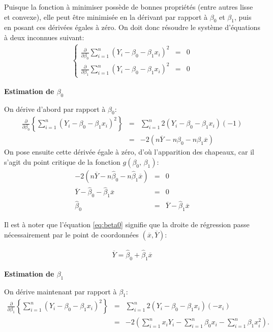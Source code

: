 Puisque la fonction \`a minimiser possède de bonnes propri\'et\'es
(entre autres lisse et convexe), elle peut être minimisée en la dérivant par rapport \`a ${\beta}_0$ et ${\beta}_1$, puis en posant ces d\'eriv\'ees \'egales \`a z\'ero. On doit donc résoudre le système d'équations \`a deux inconnues suivant:
\begin{eqnarray}
\left\{ \begin{array}{ccc}
\frac{\partial}{\partial{\beta}_0}
\sum_{i=1}^n(Y_i-{\beta}_0-{\beta}_1 x_i)^2
&=&\label{eq1} 0 \\
\frac{\partial}{\partial{\beta}_1}
\sum_{i=1}^n(Y_i-{\beta}_0-{\beta}_1 x_i)^2
&=&\label{eq2} 0
\end{array}
\right.
\end{eqnarray}

\textbf{Estimation de $\beta_0$}

On dérive d'abord par rapport à $\beta_0$:
\begin{eqnarray*}
 \frac{\partial}{\partial \beta_0} \left\{\sum_{i=1}^n (Y_i - \beta_0 - \beta_1 x_i)^2\right\} &=& \sum_{i=1}^n 2(Y_i - \beta_0 - \beta_1 x_i)(-1)\\
 &=& -2( n \overline{Y} - n \beta_0 - n \beta_1 \overline{x})
\end{eqnarray*}
On pose ensuite cette dérivée égale à zéro, d'où l'apparition des chapeaux, car il s'agit du point critique de la fonction $g(\beta_0,\,\beta_1)$:
\begin{eqnarray}
-2(n \overline{Y} - n \hat\beta_0 - n \hat\beta_1 \overline{x}) & = & 0 \nonumber\\
 \overline{Y} - \hat\beta_0 - \hat\beta_1 \overline{x} & = & 0 \nonumber\\
 \hat\beta_0 & = &  \overline{Y} - \hat\beta_1 \overline{x}
\label{eq:beta0}
\end{eqnarray}


\begin{remarque}
 Il est à noter que l'équation \eqref{eq:beta0} signifie que la droite de régression passe nécessairement par le point de coordonnées $(\overline{x},\overline{Y})$:

\begin{eqnarray}
\overline{Y} = \hat\beta_0+ \hat\beta_1 \overline{x}
 \label{eq:dbeta0egal0}
\end{eqnarray}
\end{remarque}

\textbf{Estimation de $\beta_1$}

On dérive maintenant par rapport à $\beta_1$:
\begin{eqnarray*}
 \frac{\partial}{\partial \beta_1} \left\{\sum_{i=1}^n (Y_i - \beta_0 - \beta_1 x_i)^2\right\} &=& \sum_{i=1}^n 2(Y_i - \beta_0 - \beta_1 x_i)(-x_i)\\
 &=& -2 \left(\sum_{i=1}^n x_i Y_i - \sum_{i=1}^n  \beta_0 x_i - \sum_{i=1}^n  \beta_1 x_i^2 \right).
\end{eqnarray*}

